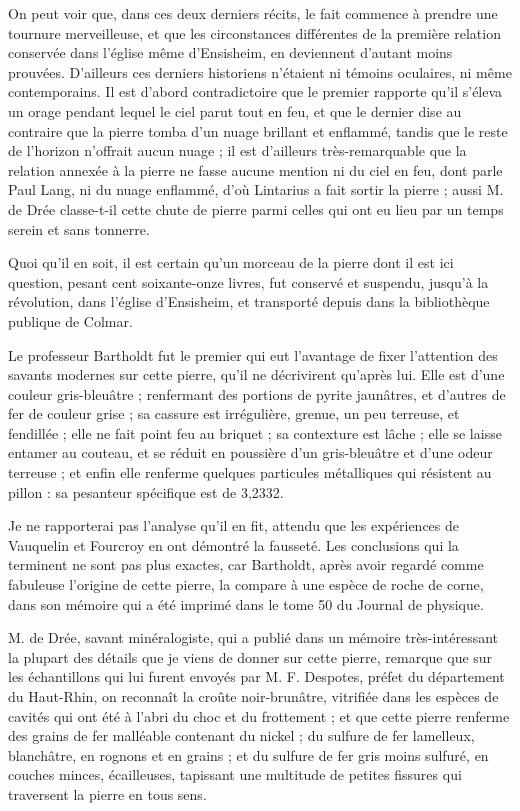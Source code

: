 \documentclass[a4paper, 12pt, oneside, french]{article}
\begin{document}
On peut voir que, dans ces deux derniers récits, le fait commence à prendre une tournure merveilleuse, et que les circonstances différentes de la première relation conservée dans l'église même d'Ensisheim, en deviennent d'autant moins prouvées. D'ailleurs ces derniers historiens n'étaient ni témoins oculaires, ni même contemporains. Il est d'abord contradictoire que le premier rapporte qu'il s'éleva un orage pendant lequel le ciel parut tout en feu, et que le dernier dise au contraire que la pierre tomba d'un nuage brillant et enflammé, tandis que le reste de l'horizon n'offrait aucun nuage ; il est d'ailleurs très-remarquable que la relation annexée à la pierre ne fasse aucune mention ni du ciel en feu, dont parle Paul Lang, ni du nuage enflammé, d'où Lintarius a fait sortir la pierre ; aussi M. de Drée classe-t-il cette chute de pierre parmi celles qui ont eu lieu par un temps serein et sans tonnerre.

Quoi qu'il en soit, il est certain qu'un morceau de la pierre dont il est ici question, pesant cent soixante-onze livres, fut conservé et suspendu, jusqu'à la révolution, dans l'église d'Ensisheim, et transporté depuis dans la bibliothèque publique de Colmar.

Le professeur Bartholdt fut le premier qui eut l'avantage de fixer l'attention des savants modernes sur cette pierre, qu'il ne décrivirent qu'après lui. Elle est d'une couleur gris-bleuâtre ; renfermant des portions de pyrite jaunâtres, et d'autres de fer de couleur grise ; sa cassure est irrégulière, grenue, un peu terreuse, et fendillée ; elle ne fait point feu au briquet ; sa contexture est lâche ; elle se laisse entamer au couteau, et se réduit en poussière d'un gris-bleuâtre et d'une odeur terreuse ; et enfin elle renferme quelques particules métalliques qui résistent au pillon : sa pesanteur spécifique est de 3,2332.

Je ne rapporterai pas l'analyse qu'il en fit, attendu que les expériences de Vauquelin et Fourcroy en ont démontré la fausseté. Les conclusions qui la terminent ne sont pas plus exactes, car Bartholdt, après avoir regardé comme fabuleuse l'origine de cette pierre, la compare à une espèce de roche de corne, dans son mémoire qui a été imprimé dans le tome 50 du Journal de physique.

M. de Drée, savant minéralogiste, qui a publié dans un mémoire très-intéressant la plupart des détails que je viens de donner sur cette pierre, remarque que sur les échantillons qui lui furent envoyés par M. F. Despotes, préfet du département du Haut-Rhin, on reconnaît la croûte noir-brunâtre, vitrifiée dans les espèces de cavités qui ont été à l'abri du choc et du frottement ; et que cette pierre renferme des grains de fer malléable contenant du nickel ; du sulfure de fer lamelleux, blanchâtre, en rognons et en grains ; et du sulfure de fer gris moins sulfuré, en couches minces, écailleuses, tapissant une multitude de petites fissures qui traversent la pierre en tous sens.
\end{document}

